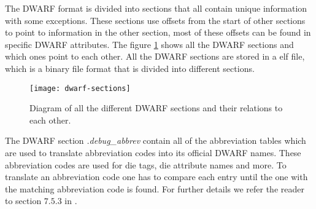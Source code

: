  


The \gls{DWARF} format is divided into sections that all contain unique information with some exceptions.
These sections use offsets from the start of other sections to point to information in the other section, most of these offsets can be found in specific \gls{DWARF} attributes.
The figure \ref{fig:dwarfsections} shows all the \gls{DWARF} sections and which ones point to each other.
All the \gls{DWARF} sections are stored in a \gls{elf} file, which is a binary file format that is divided into different sections.




\begin{figure}[h]
	\centering
	\texttt{[image: dwarf-sections]}
	\caption{Diagram of all the different \gls{DWARF} sections and their relations to each other.}
	\label{fig:dwarfsections}
\end{figure}


The \gls{DWARF} section \emph{.debug\_abbrev} contain all of the abbreviation tables which are used to translate abbreviation codes into its official \gls{DWARF} names.
These abbreviation codes are used for \gls{die} tags, \gls{die} attribute names and more.
To translate an abbreviation code one has to compare each entry until the one with the matching abbreviation code is found.
For further details we refer the reader to section $7.5.3$ in \cite{dwarf}.


